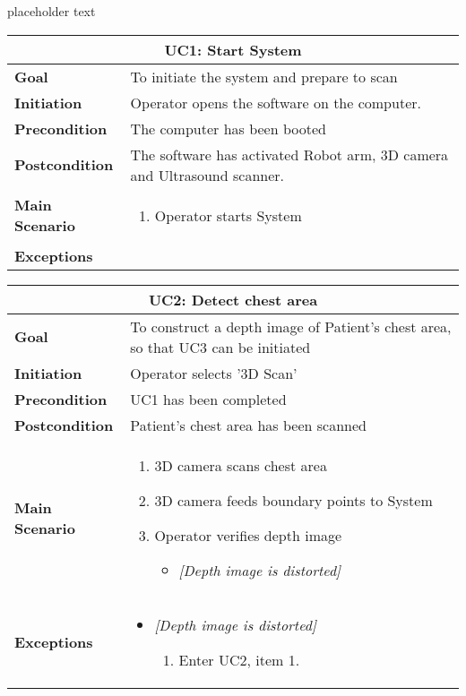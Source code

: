 \documentclass{report}
\begin{document}
placeholder text
\newline
\begin{tabular}{ | l | p{} | }
  \hline
  \multicolumn{2}{|c|}{\textbf{UC1: Start System}} \\ \hline
  \textbf{Goal} & To initiate the system and prepare to scan  \\ \hline
  \textbf{Initiation} & Operator opens the software on the computer.  \\ \hline
  \textbf{Precondition} & The computer has been booted  \\ \hline
  \textbf{Postcondition} & The software has activated Robot arm, 3D camera and Ultrasound scanner.  \\ \hline
  \textbf{Main Scenario} & 
  	{\begin{enumerate} 
  	\item Operator starts System
  	\end{enumerate}} \\ \hline
  \textbf{Exceptions} & \hspace{1cm} \\ \hline
\end{tabular}
\newline
\vspace*{1 cm}
\newline
\begin{tabular}{ | l | p{} | }
  \hline
  \multicolumn{2}{|c|}{\textbf{UC2: Detect chest area}} \\ \hline
  \textbf{Goal} & To construct a depth image of Patient’s chest area, so that UC3 can be initiated  \\ \hline
  \textbf{Initiation} & Operator selects ’3D Scan’  \\ \hline
  \textbf{Precondition} & UC1 has been completed  \\ \hline
  \textbf{Postcondition} & Patient’s chest area has been scanned \\ \hline
  \textbf{Main Scenario} & 
  	{\begin{enumerate} 
  	\item 3D camera scans chest area
  	\item 3D camera feeds boundary points to System
  	\item Operator verifies depth image
  		\begin{itemize}
  		\item \textit{[Depth image is distorted]}
  		\end{itemize}
  	\end{enumerate}} \\ \hline
  \textbf{Exceptions} & 
  	{\begin{itemize} 
  	\item \textit{[Depth image is distorted]}
  		\begin{enumerate}
  		\item Enter UC2, item 1.
  		\end{enumerate}
  	\end{itemize}} \\ \hline
\end{tabular}
\end{document}

